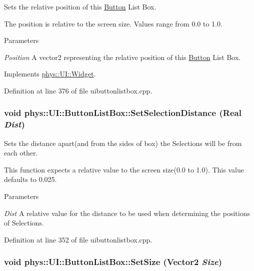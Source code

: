 Sets the relative position of this \hyperlink{classphys_1_1UI_1_1Button}{Button} List Box. 

The position is relative to the screen size. Values range from 0.0 to 1.0. 
\begin{DoxyParams}{Parameters}
\item[{\em Position}]A vector2 representing the relative position of this \hyperlink{classphys_1_1UI_1_1Button}{Button} List Box. \end{DoxyParams}


Implements \hyperlink{classphys_1_1UI_1_1Widget_aae1c0b891125823e7ade8cbc7e4ba6b6}{phys::UI::Widget}.



Definition at line 376 of file uibuttonlistbox.cpp.

\hypertarget{classphys_1_1UI_1_1ButtonListBox_a85a4c25d78b8fa81ae7031ad127958bd}{
\subsubsection[{SetSelectionDistance}]{\setlength{\rightskip}{0pt plus 5cm}void phys::UI::ButtonListBox::SetSelectionDistance ({\bf Real} {\em Dist})}}
\label{d4/dd7/classphys_1_1UI_1_1ButtonListBox_a85a4c25d78b8fa81ae7031ad127958bd}


Sets the distance apart(and from the sides of box) the Selections will be from each other. 

This function expects a relative value to the screen size(0.0 to 1.0). This value defaults to 0.025. 
\begin{DoxyParams}{Parameters}
\item[{\em Dist}]A relative value for the distance to be used when determining the positions of Selections. \end{DoxyParams}


Definition at line 352 of file uibuttonlistbox.cpp.

\hypertarget{classphys_1_1UI_1_1ButtonListBox_a527f2c332225a04e147264dd80e4a6c1}{
\subsubsection[{SetSize}]{\setlength{\rightskip}{0pt plus 5cm}void phys::UI::ButtonListBox::SetSize ({\bf Vector2} {\em Size})}}
\label{d4/dd7/classphys_1_1UI_1_1ButtonListBox_a527f2c332225a04e147264dd80e4a6c1}


